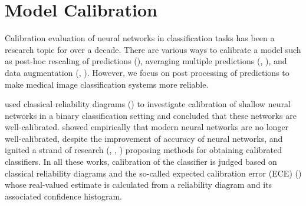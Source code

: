 \section{Model Calibration}

Calibration evaluation of neural networks in classification tasks has been a research topic for over a decade. There are various ways to calibrate a model such as post-hoc rescaling of predictions (\cite{guo2017calibration}), averaging multiple predictions (\cite{lakshminarayanan2017simple}, \cite{wen2020batchensemble}), and data augmentation (\cite{thulasidasan2019mixup}, \cite{wen2020combining}). However, we focus on post processing of predictions to make medical image classification systems more reliable.

\cite{niculescu2005predicting} used classical reliability diagrams (\cite{murphy1977reliability}) to investigate calibration of shallow neural networks in a binary
classification setting and concluded that these networks are
well-calibrated. \cite{guo2017calibration} showed empirically that  modern neural networks are no longer well-calibrated, despite the improvement of accuracy of neural networks, and ignited a strand of research (\cite{kumar2018trainable}, \cite{zhang2018noisy}, \cite{kendall2017uncertainties})
proposing methods for obtaining calibrated classifiers. In
all these works, calibration of the classifier is judged based
on classical reliability diagrams and the so-called expected
calibration error (ECE) (\cite{guo2017calibration}) whose real-valued
estimate is calculated from a reliability diagram and its associated confidence histogram.









